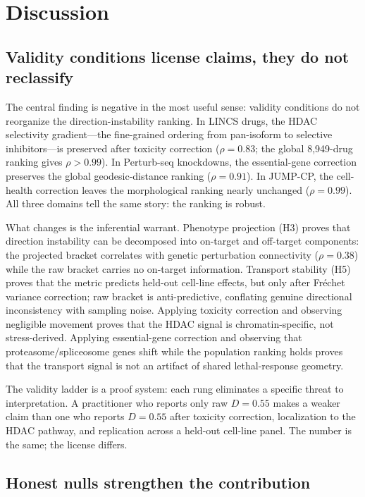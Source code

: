 \documentclass{article}
\begin{document}
\section{Discussion}

\subsection{Validity conditions license claims, they do not reclassify}

The central finding is negative in the most useful sense: validity conditions
do not reorganize the direction-instability ranking. In LINCS drugs, the
HDAC selectivity gradient---the fine-grained ordering from pan-isoform to
selective inhibitors---is preserved after toxicity correction ($\rho =
0.83$; the global 8{,}949-drug ranking gives $\rho > 0.99$). In Perturb-seq
knockdowns, the essential-gene correction preserves the global
geodesic-distance ranking ($\rho = 0.91$). In JUMP-CP, the cell-health
correction leaves the morphological ranking nearly unchanged ($\rho =
0.99$). All three domains tell the same story: the ranking is robust.

What changes is the inferential warrant. Phenotype projection (H3) proves
that direction instability can be decomposed into on-target and off-target
components: the projected bracket correlates with genetic perturbation
connectivity ($\rho = 0.38$) while the raw bracket carries no on-target
information. Transport stability (H5) proves that the metric predicts
held-out cell-line effects, but only after Fr\'{e}chet variance correction;
raw bracket is anti-predictive, conflating genuine directional inconsistency
with sampling noise. Applying toxicity correction and
observing negligible movement proves that the HDAC signal is
chromatin-specific, not stress-derived. Applying essential-gene correction
and observing that proteasome/spliceosome genes shift while the population
ranking holds proves that the transport signal is not an artifact of shared
lethal-response geometry.

The validity ladder is a proof system: each rung eliminates a specific threat
to interpretation. A practitioner who reports only raw $D = 0.55$ makes a
weaker claim than one who reports $D = 0.55$ after toxicity correction,
localization to the HDAC pathway, and replication across a held-out cell-line
panel. The number is the same; the license differs.

\subsection{Honest nulls strengthen the contribution}
\end{document}
